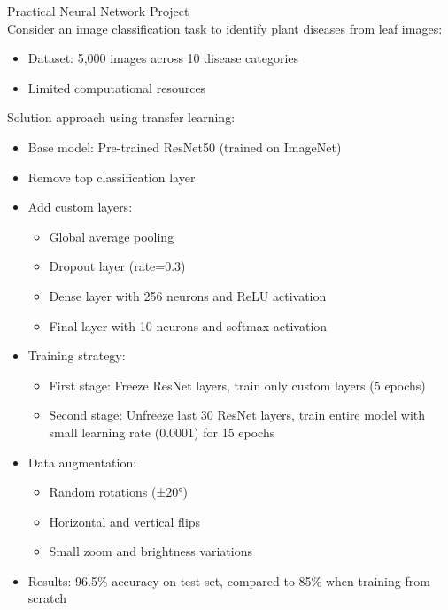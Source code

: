 \begin{example2}{Practical Neural Network Project}\\
Consider an image classification task to identify plant diseases from leaf images:
\begin{itemize}
    \item Dataset: 5,000 images across 10 disease categories
    \item Limited computational resources
\end{itemize}
\tcblower
Solution approach using transfer learning:
\begin{itemize}
    \item Base model: Pre-trained ResNet50 (trained on ImageNet)
    \item Remove top classification layer
    \item Add custom layers:
    \begin{itemize}
        \item Global average pooling
        \item Dropout layer (rate=0.3)
        \item Dense layer with 256 neurons and ReLU activation
        \item Final layer with 10 neurons and softmax activation
    \end{itemize}
    \item Training strategy:
    \begin{itemize}
        \item First stage: Freeze ResNet layers, train only custom layers (5 epochs)
        \item Second stage: Unfreeze last 30 ResNet layers, train entire model with small learning rate (0.0001) for 15 epochs
    \end{itemize}
    \item Data augmentation:
    \begin{itemize}
        \item Random rotations (±20°)
        \item Horizontal and vertical flips
        \item Small zoom and brightness variations
    \end{itemize}
    \item Results: 96.5\% accuracy on test set, compared to 85\% when training from scratch
\end{itemize}
\end{example2}

